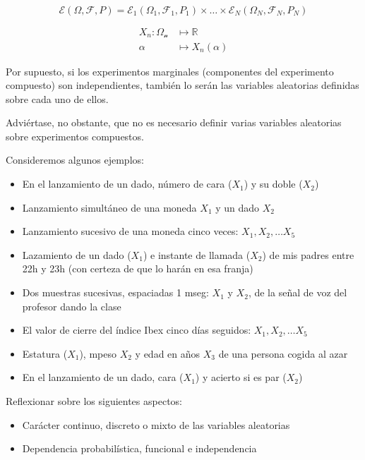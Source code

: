 \documentclass[11pt]{article}
\providecommand{\tightlist}{%
      \setlength{\itemsep}{0pt}\setlength{\parskip}{0pt}}
\begin{document}
\[\mathscr{E}(\Omega, \mathscr{F}, P) = \mathscr{E}_1(\Omega_1, \mathscr{F}_1, P_1) \times \ldots \times \mathscr{E}_N(\Omega_N, \mathscr{F}_N, P_N)\]

\begin{align*}
X_n:  \mathscr{\Omega_n} & \longmapsto \mathbb{R}\\
   \alpha & \longmapsto X_n(\alpha)
   \end{align*}
 

Por supuesto, si los experimentos marginales (componentes del
experimento compuesto) son independientes, también lo serán las
variables aleatorias definidas sobre cada uno de ellos.

Adviértase, no obstante, que no es necesario definir varias variables
aleatorias sobre experimentos compuestos.

    Consideremos algunos ejemplos:

\begin{itemize}
\tightlist
\item
  En el lanzamiento de un dado, número de cara (\(X_1\)) y su doble
  (\(X_2\))
\item
  Lanzamiento simultáneo de una moneda \(X_1\) y un dado \(X_2\)
\item
  Lanzamiento sucesivo de una moneda cinco veces:
  \(X_1, X_2, \ldots X_5\)
\item
  Lazamiento de un dado (\(X_1\)) e instante de llamada (\(X_2\)) de mis
  padres entre 22h y 23h (con certeza de que lo harán en esa franja)
\item
  Dos muestras sucesivas, espaciadas 1 mseg: \(X_1\) y \(X_2\), de la
  señal de voz del profesor dando la clase
\item
  El valor de cierre del índice Ibex cinco días seguidos:
  \(X_1, X_2, \ldots X_5\)
\item
  Estatura (\(X_1\)), mpeso \(X_2\) y edad en años \(X_3\) de una
  persona cogida al azar
\item
  En el lanzamiento de un dado, cara (\(X_1\)) y acierto si es par
  (\(X_2\))
\end{itemize}

Reflexionar sobre los siguientes aspectos:

\begin{itemize}
\tightlist
\item
  Carácter continuo, discreto o mixto de las variables aleatorias
\item
  Dependencia probabilística, funcional e independencia
\end{itemize}
\end{document}
